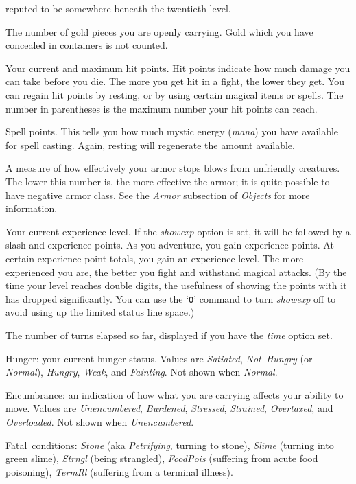 \documentclass[titlepage]{article}
\begin{document}
\begin{description}
reputed to be somewhere beneath the twentieth level.
\item[Gold]
The number of gold pieces you are openly carrying.  Gold which you have
concealed in containers is not counted.
\item[Hit Points]
Your current and maximum hit points.  Hit points indicate how much
damage you can take before you die.  The more you get hit in a fight,
the lower they get.  You can regain hit points by resting, or by using
certain magical items or spells.  The number in parentheses is the maximum
number your hit points can reach.
\item[Power]
Spell points.  This tells you how much mystic energy (\textit{mana})
you have available for spell casting.  Again, resting will regenerate the
amount available.
\item[Armor Class]
A measure of how effectively your armor stops blows from unfriendly
creatures.  The lower this number is, the more effective the armor; it
is quite possible to have negative armor class.
See the \textit{Armor} subsection of \textit{Objects} for more information.
\item[Experience]
Your current experience level.
If the \textit{showexp}
option is set, it will be followed by a slash and experience points.
As you adventure, you gain experience points.
At certain experience point totals, you gain an experience level.
The more experienced you are, the better you fight and withstand magical
attacks.
(By the time your level reaches double digits, the usefulness of showing
the points with it has dropped significantly.
You can use the `\texttt{O}' command to turn \textit{showexp}
off to avoid using up the limited status line space.)
\item[Time]
The number of turns elapsed so far, displayed if you have the
\textit{time} option set.
\item[Status]
Hunger:
your current hunger status.
Values are \textit{Satiated}, \textit{Not~Hungry} (or \textit{Normal}),
\textit{Hungry}, \textit{Weak}, and \textit{Fainting}.
Not shown when \textit{Normal}.

Encumbrance:
an indication of how what you are carrying affects your ability to move.
Values are \textit{Unencumbered}, \textit{Burdened}, \textit{Stressed},
\textit{Strained}, \textit{Overtaxed}, and \textit{Overloaded}.
Not shown when \textit{Unencumbered}.

Fatal~conditions:
\textit{Stone} (aka \textit{Petrifying}, turning to stone),
\textit{Slime} (turning into green slime),
\textit{Strngl} (being strangled),
\textit{FoodPois} (suffering from acute food poisoning),
\textit{TermIll} (suffering from a terminal illness).


\end{description}
\end{document}
